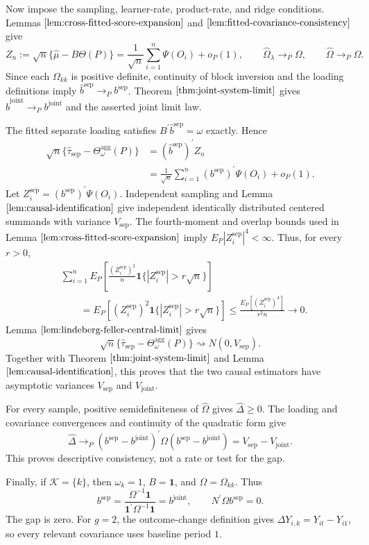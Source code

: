Now impose the sampling, learner-rate, product-rate, and ridge conditions. Lemmas \(\ref{lem:cross-fitted-score-expansion}\) and \(\ref{lem:fitted-covariance-consistency}\) give
\[
 Z_n:=\sqrt n\{\widehat\mu-B\Theta(P)\}
 =\frac1{\sqrt n}\sum_{i=1}^n\Psi(O_i)+o_P(1),
 \qquad
 \widehat\Omega_\lambda\to_P\Omega,
 \qquad
 \widehat\Omega\to_P\Omega.
\]
Since each \(\Omega_{kk}\) is positive definite, continuity of block inversion and the loading definitions imply \(\widehat b^{\mathrm{sep}}\to_Pb^{\mathrm{sep}}\). Theorem \(\ref{thm:joint-system-limit}\) gives \(\widehat b^{\mathrm{joint}}\to_Pb^{\mathrm{joint}}\) and the asserted joint limit law.

The fitted separate loading satisfies \(B^{\prime}\widehat b^{\mathrm{sep}}=\omega\) exactly. Hence
\[
\begin{aligned}
 \sqrt n\{\widehat\tau_{\mathrm{sep}}-
 \Theta_\omega^{\mathrm{agg}}(P)\}
 &=(\widehat b^{\mathrm{sep}})^{\prime}Z_n\\
 &=\frac1{\sqrt n}\sum_{i=1}^n
 (b^{\mathrm{sep}})^{\prime}\Psi(O_i)+o_P(1).
\end{aligned}
\]
Let \(Z_i^{\mathrm{sep}}=(b^{\mathrm{sep}})^{\prime}\Psi(O_i)\). Independent sampling and Lemma \(\ref{lem:causal-identification}\) give independent identically distributed centered summands with variance \(V_{\mathrm{sep}}\). The fourth-moment and overlap bounds used in Lemma \(\ref{lem:cross-fitted-score-expansion}\) imply \(E_P|Z_i^{\mathrm{sep}}|^4<\infty\). Thus, for every \(r>0\),
\[
\begin{aligned}
 &\sum_{i=1}^nE_P\!\left[
 \frac{(Z_i^{\mathrm{sep}})^2}{n}
 \mathbf 1\{|Z_i^{\mathrm{sep}}|>r\sqrt n\}\right]\\
 &\qquad=E_P[(Z_i^{\mathrm{sep}})^2
 \mathbf 1\{|Z_i^{\mathrm{sep}}|>r\sqrt n\}]
 \le\frac{E_P[(Z_i^{\mathrm{sep}})^4]}{r^2n}\longrightarrow0.
\end{aligned}
\]
Lemma \(\ref{lem:lindeberg-feller-central-limit}\) gives
\[
 \sqrt n\{\widehat\tau_{\mathrm{sep}}-
 \Theta_\omega^{\mathrm{agg}}(P)\}
 \rightsquigarrow N(0,V_{\mathrm{sep}}).
\]
Together with Theorem \(\ref{thm:joint-system-limit}\) and Lemma \(\ref{lem:causal-identification}\), this proves that the two causal estimators have asymptotic variances \(V_{\mathrm{sep}}\) and \(V_{\mathrm{joint}}\).

For every sample, positive semidefiniteness of \(\widehat\Omega\) gives \(\widehat\Delta\ge0\). The loading and covariance convergences and continuity of the quadratic form give
\[
 \widehat\Delta\to_P
 (b^{\mathrm{sep}}-b^{\mathrm{joint}})^{\prime}
 \Omega(b^{\mathrm{sep}}-b^{\mathrm{joint}})
 =V_{\mathrm{sep}}-V_{\mathrm{joint}}.
\]
This proves descriptive consistency, not a rate or test for the gap.

Finally, if \(\mathcal K=\{k\}\), then \(\omega_k=1\), \(B=\mathbf 1\), and \(\Omega=\Omega_{kk}\). Thus
\[
 b^{\mathrm{sep}}
 =\frac{\Omega^{-1}\mathbf 1}
 {\mathbf 1^{\prime}\Omega^{-1}\mathbf 1}
 =b^{\mathrm{joint}},
 \qquad
 N^{\prime}\Omega b^{\mathrm{sep}}=0.
\]
The gap is zero. For \(g=2\), the outcome-change definition gives \(\Delta Y_{i,k}=Y_{it}-Y_{i1}\), so every relevant covariance uses baseline period \(1\).